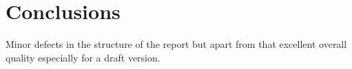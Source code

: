 \section{Conclusions}
Minor defects in the structure of the report but apart from that excellent overall 
quality especially for a draft version.

